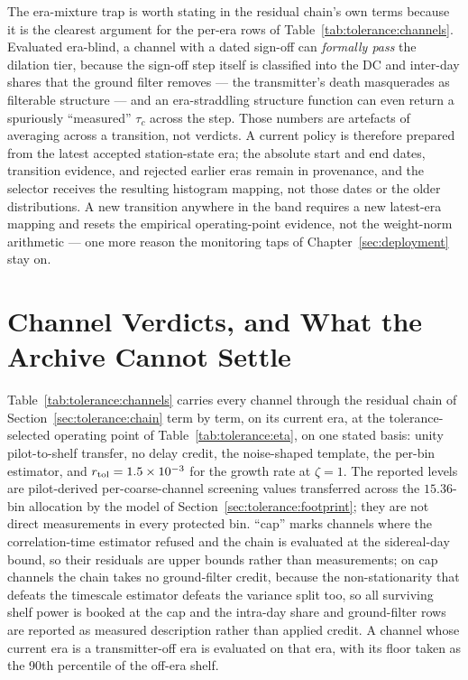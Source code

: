 The era-mixture trap is worth stating in the residual chain's own terms because it is the clearest argument for the per-era rows of Table~\ref{tab:tolerance:channels}. Evaluated era-blind, a channel with a dated sign-off can \emph{formally pass} the dilation tier, because the sign-off step itself is classified into the DC and inter-day shares that the ground filter removes --- the transmitter's death masquerades as filterable structure --- and an era-straddling structure function can even return a spuriously ``measured'' $\tau_c$ across the step. Those numbers are artefacts of averaging across a transition, not verdicts. A current policy is therefore prepared from the latest accepted station-state era; the absolute start and end dates, transition evidence, and rejected earlier eras remain in provenance, and the selector receives the resulting histogram mapping, not those dates or the older distributions. A new transition anywhere in the band requires a new latest-era mapping and resets the empirical operating-point evidence, not the weight-norm arithmetic --- one more reason the monitoring taps of Chapter~\ref{sec:deployment} stay on.

\section{Channel Verdicts, and What the Archive Cannot Settle}
\label{sec:tolerance:verdicts}

Table~\ref{tab:tolerance:channels} carries every channel through the residual chain of Section~\ref{sec:tolerance:chain} term by term, on its current era, at the tolerance-selected operating point of Table~\ref{tab:tolerance:eta}, on one stated basis: unity pilot-to-shelf transfer, no delay credit, the noise-shaped template, the per-bin estimator, and $r_{\rm tol} = 1.5\times10^{-3}$ for the growth rate at $\zeta = 1$. The reported levels are pilot-derived per-coarse-channel screening values transferred across the $15.36$-bin allocation by the model of Section~\ref{sec:tolerance:footprint}; they are not direct measurements in every protected bin. ``cap'' marks channels where the correlation-time estimator refused and the chain is evaluated at the sidereal-day bound, so their residuals are upper bounds rather than measurements; on cap channels the chain takes no ground-filter credit, because the non-stationarity that defeats the timescale estimator defeats the variance split too, so all surviving shelf power is booked at the cap and the intra-day share and ground-filter rows are reported as measured description rather than applied credit. A channel whose current era is a transmitter-off era is evaluated on that era, with its floor taken as the 90th percentile of the off-era shelf.

